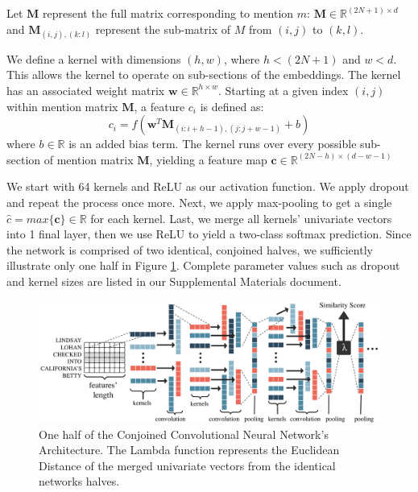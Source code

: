 \documentclass[11pt,a4paper]{article}
\begin{document}
\vspace{3mm}

Let $\textbf{M}$ represent the full matrix corresponding to mention $m$: $\textbf{M} \in \mathbb{R}^{(2N+1) \times d}$ and $\textbf{M}_{(i,j),(k:l)}$ represent the sub-matrix of $M$ from $(i,j)$ to $(k,l)$.

\vspace{3mm}

We define a kernel with dimensions $(h,w)$, where $h < (2N+1)$ and $w < d$.  This allows the kernel to operate on sub-sections of the embeddings.  The kernel has an associated weight matrix $\textbf{w} \in \mathbb{R}^{h \times w}$.  Starting at a given index $(i,j)$ within mention matrix $\textbf{M}$, a feature $c_{i}$ is defined as:
\begin{equation}
c_{i} = f(\textbf{w}^{T}\textbf{M}_{(i:i+h-1),(j:j+w-1)} + b)
\end{equation}
where $b \in \mathbb{R}$ is an added bias term.  The kernel runs over every possible sub-section of mention matrix $\textbf{M}$, yielding a feature map $\textbf{c} \in \mathbb{R}^{(2N-h) \times (d-w-1)}$

\vspace{3mm}

We start with 64 kernels and ReLU as our activation function.  We apply dropout and repeat the process once more. Next, we apply max-pooling to get a single $\hat{c} = max\{\textbf{c\}} \in \mathbb{R}$ for each kernel. Last, we merge all kernels' univariate vectors into 1 final layer, then we use ReLU to yield a two-class softmax prediction.  Since the network is comprised of two identical, conjoined halves, we sufficiently illustrate only one half in Figure \ref{fig:ccnn}.  Complete parameter values such as dropout and kernel sizes are listed in our Supplemental Materials document.

\begin{figure}[h]
\centering
	\includegraphics[width=1\textwidth]{architecture.pdf}
	\caption{One half of the Conjoined Convolutional Neural Network's Architecture.  The Lambda function represents the Euclidean Distance of the merged univariate vectors from the identical networks halves.}
	\label{fig:ccnn}
\end{figure}
\end{document}
